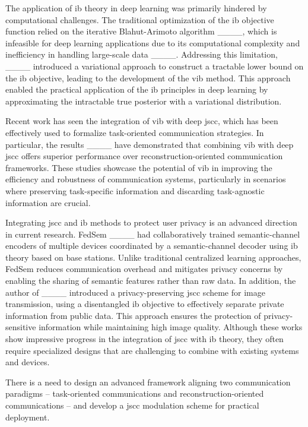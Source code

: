 The application of \gls{ib} theory in deep learning was primarily hindered by computational challenges. The traditional optimization of the \gls{ib} objective function relied on the iterative Blahut-Arimoto algorithm ____, which is infeasible for deep learning applications due to its computational complexity and inefficiency in handling large-scale data ____. Addressing this limitation, ____ introduced a variational approach to construct a tractable lower bound on the \gls{ib} objective, leading to the development of the \gls{vib} method. This approach enabled the practical application of the \gls{ib} principles in deep learning by approximating the intractable true posterior with a variational distribution.

Recent work has seen the integration of \gls{vib} with deep \gls{jscc}, which has been effectively used to formalize task-oriented communication strategies. In particular, the results ____ have demonstrated that combining \gls{vib} with deep \gls{jscc} offers superior performance over reconstruction-oriented communication frameworks. These studies showcase the potential of \gls{vib} in improving the efficiency and robustness of communication systems, particularly in scenarios where preserving task-specific information and discarding task-agnostic information are crucial.

Integrating \gls{jscc} and \gls{ib} methods to protect user privacy is an advanced direction in current research. FedSem ____ had collaboratively trained semantic-channel encoders of multiple devices coordinated by a semantic-channel decoder using \gls{ib} theory based on base stations. Unlike traditional centralized learning approaches, FedSem reduces communication overhead and mitigates privacy concerns by enabling the sharing of semantic features rather than raw data. In addition, the author of ____ introduced a privacy-preserving \gls{jscc} scheme for image transmission, using a disentangled \gls{ib} objective to effectively separate private information from public data. This approach ensures the protection of privacy-sensitive information while maintaining high image quality. Although these works show impressive progress in the integration of \gls{jscc} with \gls{ib} theory, they often require specialized designs that are challenging to combine with existing systems and devices.

There is a need to design an advanced framework aligning two communication paradigms -- task-oriented communications and reconstruction-oriented communications -- and develop a \gls{jscc} modulation scheme for practical deployment.